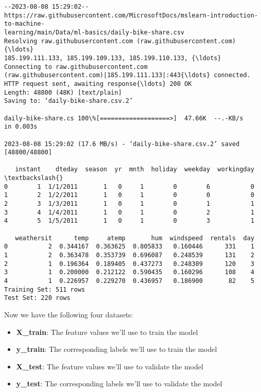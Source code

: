 \documentclass[11pt]{article}
\providecommand{\tightlist}{%
      \setlength{\itemsep}{0pt}\setlength{\parskip}{0pt}}
\begin{document}
    \begin{Verbatim}[commandchars=\\\{\}]
--2023-08-08 15:29:02--
https://raw.githubusercontent.com/MicrosoftDocs/mslearn-introduction-to-machine-
learning/main/Data/ml-basics/daily-bike-share.csv
Resolving raw.githubusercontent.com (raw.githubusercontent.com){\ldots}
185.199.111.133, 185.199.109.133, 185.199.110.133, {\ldots}
Connecting to raw.githubusercontent.com
(raw.githubusercontent.com)|185.199.111.133|:443{\ldots} connected.
HTTP request sent, awaiting response{\ldots} 200 OK
Length: 48800 (48K) [text/plain]
Saving to: ‘daily-bike-share.csv.2’

daily-bike-share.cs 100\%[===================>]  47.66K  --.-KB/s    in 0.003s

2023-08-08 15:29:02 (17.6 MB/s) - ‘daily-bike-share.csv.2’ saved [48800/48800]

   instant    dteday  season  yr  mnth  holiday  weekday  workingday  \textbackslash{}
0        1  1/1/2011       1   0     1        0        6           0
1        2  1/2/2011       1   0     1        0        0           0
2        3  1/3/2011       1   0     1        0        1           1
3        4  1/4/2011       1   0     1        0        2           1
4        5  1/5/2011       1   0     1        0        3           1

   weathersit      temp     atemp       hum  windspeed  rentals  day
0           2  0.344167  0.363625  0.805833   0.160446      331    1
1           2  0.363478  0.353739  0.696087   0.248539      131    2
2           1  0.196364  0.189405  0.437273   0.248309      120    3
3           1  0.200000  0.212122  0.590435   0.160296      108    4
4           1  0.226957  0.229270  0.436957   0.186900       82    5
Training Set: 511 rows
Test Set: 220 rows
    \end{Verbatim}

    Now we have the following four datasets:

\begin{itemize}
\tightlist
\item
  \textbf{X\_train}: The feature values we'll use to train the model
\item
  \textbf{y\_train}: The corresponding labels we'll use to train the
  model
\item
  \textbf{X\_test}: The feature values we'll use to validate the model
\item
  \textbf{y\_test}: The corresponding labels we'll use to validate the
  model
\end{itemize}
\end{document}
